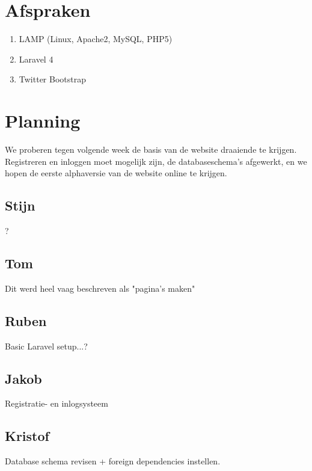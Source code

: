 \documentclass[11pt, a4paper]{article}
\begin{document}
\section{Afspraken}
\begin{enumerate}
\item LAMP (Linux, Apache2, MySQL, PHP5)
\item Laravel 4
\item Twitter Bootstrap
\end{enumerate}


\section{Planning}
We proberen tegen volgende week de basis van de website draaiende te krijgen. Registreren en inloggen moet mogelijk zijn, de databaseschema's afgewerkt, en we hopen de eerste alphaversie van de website online te krijgen.
\subsection{Stijn}
?
\subsection{Tom}
Dit werd heel vaag beschreven als "pagina's maken"
\subsection{Ruben}
Basic Laravel setup...?
\subsection{Jakob}
Registratie- en inlogsysteem
\subsection{Kristof}
Database schema revisen + foreign dependencies instellen.
\end{document}
